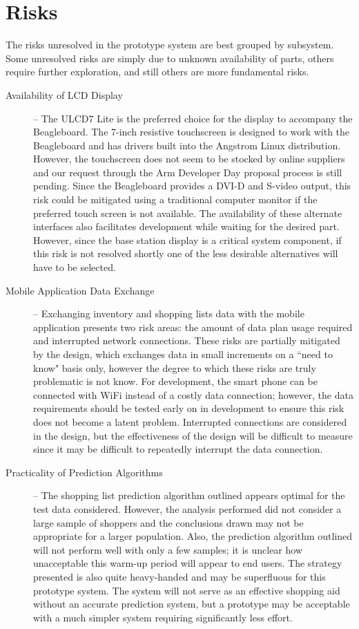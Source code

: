 \documentclass[11pt]{article} %
\begin{document}
\section{Risks}
The risks unresolved in the prototype system are best grouped by subsystem. Some unresolved risks are simply due to unknown availability of parts, others require further exploration, and still others are more fundamental risks.
\begin{description}
\item[Availability of LCD Display] -- The ULCD7 Lite is the preferred choice for the display to accompany the Beagleboard. The 7-inch resistive touchscreen is designed to work with the Beagleboard and has drivers built into the Angstrom Linux distribution. However, the touchscreen does not seem to be stocked by online suppliers and our request through the Arm Developer Day proposal process is still pending. Since the Beagleboard provides a DVI-D and S-video output, this risk could be mitigated using a traditional computer monitor if the preferred touch screen is not available. The availability of these alternate interfaces also facilitates development while waiting for the desired part. However, since the base station display is a critical system component, if this risk is not resolved shortly one of the less desirable alternatives will have to be selected.
\item[Mobile Application Data Exchange] -- Exchanging inventory and shopping lists data with the mobile application presents two risk areas: the amount of data plan usage required and interrupted network connections. These risks are partially mitigated by the design, which exchanges data in small increments on a ``need to know" basis only, however the degree to which these risks are truly problematic is not know. For development, the smart phone can be connected with WiFi instead of a costly data connection; however, the data requirements should be tested early on in development to ensure this risk does not become a latent problem. Interrupted connections are considered in the design, but the effectiveness of the design will be difficult to measure since it may be difficult to repeatedly interrupt the data connection.
\item[Practicality of Prediction Algorithms] -- The shopping list prediction algorithm outlined appears optimal for the test data considered. However, the analysis performed did not consider a large sample of shoppers and the conclusions drawn may not be appropriate for a larger population. Also, the prediction algorithm outlined will not perform well with only a few samples; it is unclear how unacceptable this warm-up period will appear to end users. The strategy presented is also quite heavy-handed and may be superfluous for this prototype system. The system will not serve as an effective shopping aid without an accurate prediction system, but a prototype may be acceptable with a much simpler system requiring significantly less effort.

\end{description}
\end{document}
